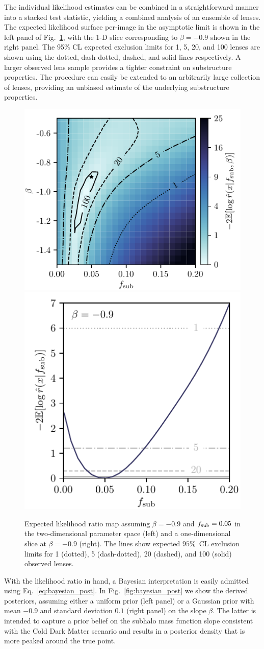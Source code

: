 \documentclass[twocolumn]{aastex62}
\begin{document}
The individual likelihood estimates can be combined in a straightforward manner into a stacked test statistic, yielding a combined analysis of an ensemble of lenses. The expected likelihood surface per-image in the asymptotic limit is shown in the left panel of Fig.~\ref{fig:expected_likelihood}, with the 1-D slice corresponding to $\beta = -0.9$ shown in the right panel. The 95\% CL expected exclusion limits for 1, 5, 20, and 100 lenses are shown using the dotted, dash-dotted, dashed, and solid lines respectively. A larger observed lens sample provides a tighter constraint on substructure properties. The procedure can easily be extended to an arbitrarily large collection of lenses, providing an unbiased estimate of the underlying substructure properties.

\begin{figure}
\centering
\includegraphics[height=0.4\textwidth]{figures/expected_likelihood_map}
\includegraphics[height=0.4\textwidth]{figures/expected_likelihood_slice}
\caption{Expected likelihood ratio map assuming $\beta = -0.9$ and $f_{\mathrm{sub}} = 0.05$ in the two-dimensional parameter space (left) and a one-dimensional slice at $\beta = -0.9$ (right). The lines show expected $95\%$~CL exclusion limits for 1 (dotted), 5 (dash-dotted), 20 (dashed), and 100 (solid) observed lenses. }
\label{fig:expected_likelihood}
\end{figure}

With the likelihood ratio in hand, a Bayesian interpretation is easily admitted using Eq.~\ref{eq:bayesian_post}. In Fig.~\ref{fig:bayesian_post} we show the derived posteriors, assuming either a uniform prior (left panel) or a Gaussian prior with mean $-0.9$ and standard deviation $0.1$ (right panel) on the slope $\beta$. The latter is intended to capture a prior belief on the subhalo mass function slope consistent with the Cold Dark Matter scenario and results in a posterior density that is more peaked around the true point.
\end{document}
